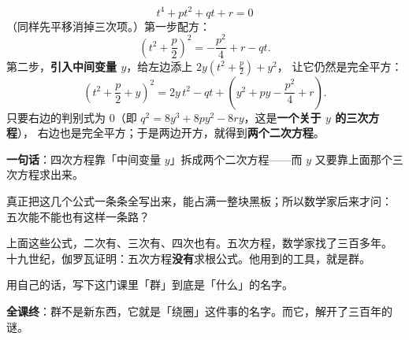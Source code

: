 \begin{example}
  \[ t^4+pt^2+qt+r=0 \]
  （同样先平移消掉三次项。）第一步配方：
  \[ \left(t^2+\frac{p}{2}\right)^2=-\frac{p^2}{4}+r-qt. \]
  第二步，\textbf{引入中间变量 \(y\)}，给左边添上 \(2y\left(t^2+\frac p2\right)+y^2\)，
  让它仍然是完全平方：
  \[ \left(t^2+\frac{p}{2}+y\right)^2
     =2y\,t^2-qt+\left(y^2+py-\frac{p^2}{4}+r\right). \]
  只要右边的判别式为 \(0\)（即 \(q^2=8y^3+8py^2-8ry\)，这是\textbf{一个关于 \(y\) 的三次方程}），
  右边也是完全平方；于是两边开方，就得到\textbf{两个二次方程}。

  \textbf{一句话}：四次方程靠「中间变量 \(y\)」拆成两个二次方程——而 \(y\) 又要靠上面那个三次方程求出来。

  真正把这几个公式一条条全写出来，能占满一整块黑板；所以数学家后来才问：
  五次能不能也有这样一条路？
\end{example}

\noindent 上面这些公式，二次有、三次有、四次也有。五次方程，数学家找了三百多年。
十九世纪，伽罗瓦证明：五次方程\textbf{没有}求根公式。他用到的工具，就是群。

\begin{xiaojie}
  用自己的话，写下这门课里「群」到底是「什么」的名字。
\end{xiaojie}

\noindent\textbf{全课终}：群不是新东西，它就是「绕圈」这件事的名字。而它，解开了三百年的谜。